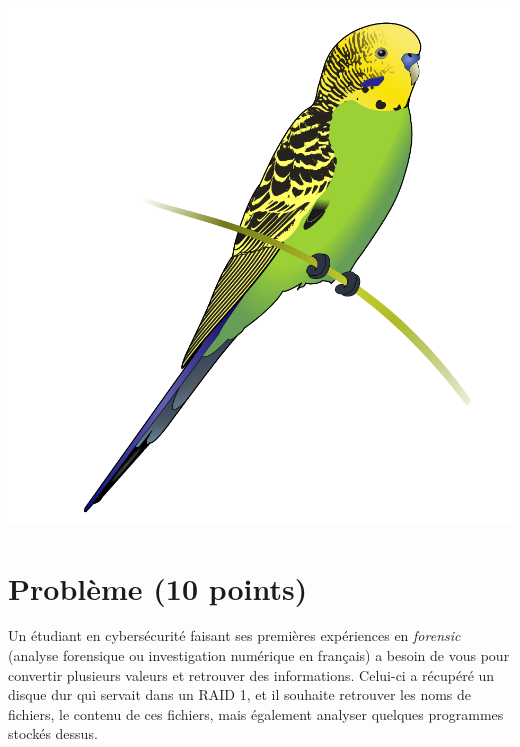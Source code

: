 \documentclass[11pt,a4paper]{article}
\begin{document}
\bigskip

\bigskip

\bigskip


\vfillFirst

\begin{center}
\includegraphics[scale=0.2]{img/others/Budgerigar_diagram.png}
\end{center}

\vfillLast



\section{Problème (10 points)}


Un étudiant en cybersécurité faisant ses premières expériences en \textit{forensic} (analyse forensique ou investigation numérique en français) a besoin de vous pour convertir plusieurs valeurs et retrouver des informations.
Celui-ci a récupéré un disque dur qui servait dans un RAID 1, et il souhaite retrouver les noms de fichiers, le contenu de ces fichiers, mais également analyser quelques programmes stockés dessus.
\end{document}
